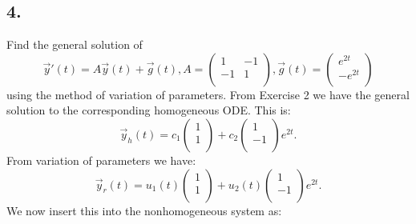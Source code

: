 \subsection*{4.} Find the general solution of
\[ 
\Vec{y}'(t) = A \Vec{y}(t) + \Vec{g}(t), A = \begin{pmatrix}
1 & -1\\
-1 & 1\\
\end{pmatrix}, \Vec{g}(t) = \begin{pmatrix}
 e^{2t}\\
 -e^{2t}\\
\end{pmatrix}
\]
using the method of variation of parameters.
\bigbreak
From Exercise 2 we have the general solution to the corresponding homogeneous ODE. This is:
\[ 
\Vec{y}_h(t) = c_1 \begin{pmatrix}
1\\
1\\
\end{pmatrix} + c_2 \begin{pmatrix}
1\\
-1\\
\end{pmatrix} e^{2t}
.\]
From variation of parameters we have:
\[ 
\Vec{y}_r(t) = u_1(t) \begin{pmatrix}
1\\
1\\
\end{pmatrix} + u_2(t) \begin{pmatrix}
1\\
-1\\
\end{pmatrix} e^{2t}
.\]
We now insert this into the nonhomogeneous system as:
